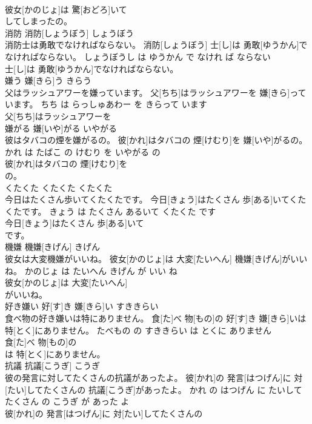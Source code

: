 \documentclass[8pt]{extreport}
\begin{document}
\begin{CJK}{UTF8}{min}
\\	彼女[かのじょ]は 驚[おどろ]いて
\\	してしまったの。			
\\	消防	消防[しょうぼう]	しょうぼう	
\\	消防士は勇敢でなければならない。	消防[しょうぼう] 士[し]は 勇敢[ゆうかん]でなければならない。	しょうぼうし は ゆうかん で なけれ ば ならない	
\\	士[し]は 勇敢[ゆうかん]でなければならない。			
\\	嫌う	嫌[きら]う	きらう	
\\	父はラッシュアワーを嫌っています。	父[ちち]はラッシュアワーを 嫌[きら]っています。	ちち は らっしゅあわー を きらって います	
\\	父[ちち]はラッシュアワーを
\\	嫌がる	嫌[いや]がる	いやがる	
\\	彼はタバコの煙を嫌がるの。	彼[かれ]はタバコの 煙[けむり]を 嫌[いや]がるの。	かれ は たばこ の けむり を いやがる の	
\\	彼[かれ]はタバコの 煙[けむり]を
\\	の。			
\\	くたくた	くたくた	くたくた	
\\	今日はたくさん歩いてくたくたです。	今日[きょう]はたくさん 歩[ある]いてくたくたです。	きょう は たくさん あるいて くたくた です	
\\	今日[きょう]はたくさん 歩[ある]いて
\\	です。			
\\	機嫌	機嫌[きげん]	きげん	
\\	彼女は大変機嫌がいいね。	彼女[かのじょ]は 大変[たいへん] 機嫌[きげん]がいいね。	かのじょ は たいへん きげん が いい ね	
\\	彼女[かのじょ]は 大変[たいへん]
\\	がいいね。			
\\	好き嫌い	好[す]き 嫌[きら]い	すききらい	
\\	食べ物の好き嫌いは特にありません。	食[た]べ 物[もの]の 好[す]き 嫌[きら]いは 特[とく]にありません。	たべもの の すききらい は とくに ありません	
\\	食[た]べ 物[もの]の
\\	は 特[とく]にありません。			
\\	抗議	抗議[こうぎ]	こうぎ	
\\	彼の発言に対してたくさんの抗議があったよ。	彼[かれ]の 発言[はつげん]に 対[たい]してたくさんの 抗議[こうぎ]があったよ。	かれ の はつげん に たいして たくさん の こうぎ が あった よ	
\\	彼[かれ]の 発言[はつげん]に 対[たい]してたくさんの

\end{CJK}
\end{document}
